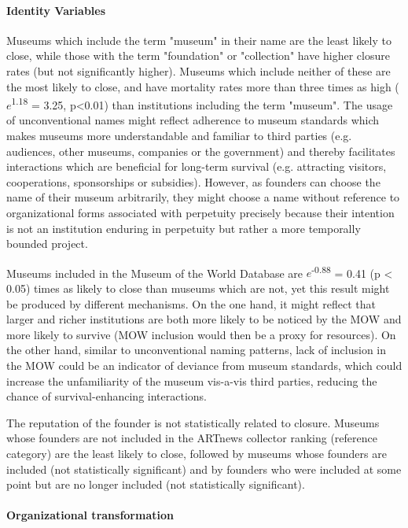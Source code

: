 \documentclass[12pt]{article}
\begin{document}
\paragraph*{Identity Variables}


Museums which include the term "museum" in their name are the least likely to close, while those with the term "foundation" or "collection" have higher closure rates (but not significantly higher).
Museums which include neither of these are the most likely to close, and have mortality rates more than three times as high (\(e\)\textsuperscript{1.18} = 3.25, p<0.01) than institutions including the term "museum".
The usage of unconventional names might reflect adherence to museum standards which makes museums more understandable and familiar to third parties (e.g. audiences, other museums, companies or the government) and thereby facilitates interactions which are beneficial for long-term survival (e.g. attracting visitors, cooperations, sponsorships or subsidies).
However, as founders can choose the name of their museum arbitrarily, they might choose a name without reference to organizational forms associated with perpetuity precisely because their intention is not an institution enduring in perpetuity but rather a more temporally bounded project.


Museums included in the Museum of the World Database are \(e\)\textsuperscript{-0.88} = 0.41 (p < 0.05) times as likely to close than museums which are not, yet this result might be produced by different mechanisms.
On the one hand, it might reflect that larger and richer institutions are both more likely to be noticed by the MOW and more likely to survive (MOW inclusion would then be a proxy for resources).
On the other hand, similar to unconventional naming patterns, lack of inclusion in the MOW could be an indicator of deviance from museum standards, which could increase the unfamiliarity of the museum vis-a-vis third parties, reducing the chance of survival-enhancing interactions.


The reputation of the founder is not statistically related to closure. 
Museums whose founders are not included in the ARTnews collector ranking (reference category) are the least likely to close, followed by museums whose founders are included (not statistically significant) and by founders who were included at some point but are no longer included (not statistically significant).

\paragraph*{Organizational transformation}
\end{document}
